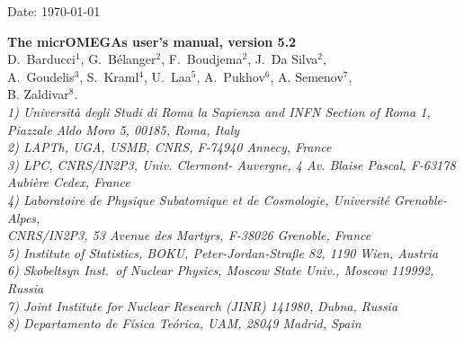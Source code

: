 \documentclass[12pt,a4paper]{article}
\begin{document}
\def\micro{{\tt micrOMEGAs}}
\def\ra{\rightarrow}
\def\calchep{{\tt CalcHEP}}

\def\suspect{{\tt SuSpect}}
\def\mbmb{m_b(m_b)}
\def\mt{m_t}
\def\dMb{\Delta m_b}
\def\dMq{\Delta m_q}
\def\delrho{\Delta\rho}
\def\bsgamma{b\to s\gamma}
\def\bsmu{B_s\to \mu^+\mu^-}
\def\gmuon{(g-2)_\mu}
\def\noi{\noindent}
\def\VERSION{5.2}
\def\neuto{\tilde\chi^0_1}
\def\neuti{\tilde\chi^0_i}
\def\neutt{\tilde\chi^0_2}
\def\neuth{\tilde\chi^0_3}
\def\smodels{{\tt SModelS}}
\def\lilith{{\tt Lilith}}
\def\HB{{\tt HiggsBounds}}
\def\HS{{\tt HiggsSignals}}

\def\eg{{\it e.g.}}
\def\ie{{\it i.e.}}

\def\br{{\rm BR}}



\def\wimpsim{{\tt WimpSim}}
\def\pppc{{\tt }PPPC4DM$\nu$}
\newcommand{\gb}{\color{blue}}
\def\SK#1{\textcolor{cyan}{#1}}

\begin{flushright}
   \vspace*{-18mm}
   Date: \today
\end{flushright}
\vspace*{2mm}




\begin{center}


{\Large\bf The micrOMEGAs  user's manual, version \VERSION} \\[8mm]

{\large   D.~Barducci$^{1}$, G.~B\'elanger$^2$,  F.~Boudjema$^2$, J.~Da Silva$^{2}$,\\[2mm] A.~Goudelis$^{3}$, S.~Kraml$^{4}$, U.~Laa$^{5}$, 
A.~Pukhov$^6$,  A. Semenov$^7$, \\[2mm]B. Zaldivar$^{8}$.}\\[4mm]

{\it 
1) Universit\`a degli Studi di Roma la Sapienza and INFN Section of Roma 1,\\ Piazzale Aldo Moro 5, 00185, Roma, Italy\\
2) LAPTh, UGA, USMB, CNRS,  F-74940 Annecy, France\\
3) LPC, CNRS/IN2P3, Univ.  Clermont- Auvergne, 4 Av. Blaise Pascal, F-63178 Aubi\`ere Cedex,  France\\
4) {Laboratoire de Physique Subatomique et de Cosmologie}, Universit\'e Grenoble-Alpes,\\ CNRS/IN2P3, 53 Avenue des Martyrs, F-38026 Grenoble,  France\\
5) Institute of Statistics, BOKU, Peter-Jordan-Straße 82, 1190 Wien, Austria\\
6) Skobeltsyn Inst.\ of Nuclear Physics, Moscow State Univ., Moscow 119992, Russia\\
7) Joint Institute for Nuclear Research (JINR) 141980, Dubna,  Russia\\
8) Departamento de F\'isica Te\'orica, UAM, 28049 Madrid, Spain \\}
\end{center}
\end{document}
